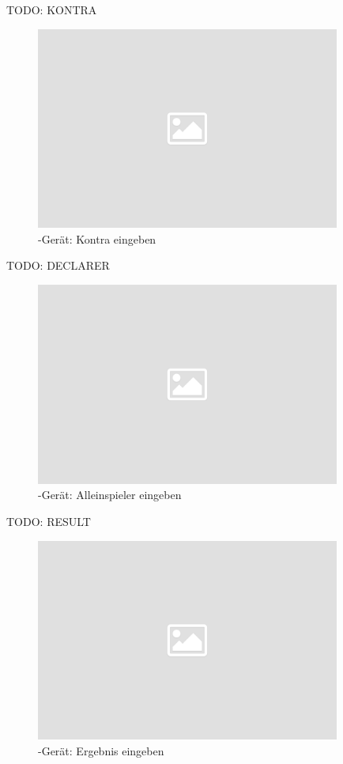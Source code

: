 \noindent
TODO: KONTRA\\[.1cm]

\noindent
\begin{figure}[ht]
	\centering
  \includegraphics[width=10cm]{pictures/placeholder.png}
	\caption{\cli-Gerät: Kontra eingeben}
	\label{pic/cli_2_contra}
\end{figure}

\noindent
TODO: DECLARER\\[.1cm]

\noindent
\begin{figure}[ht]
	\centering
  \includegraphics[width=10cm]{pictures/placeholder.png}
	\caption{\cli-Gerät: Alleinspieler eingeben}
	\label{pic/cli_2_declarer}
\end{figure}

\noindent
TODO: RESULT\\[.1cm]

\noindent
\begin{figure}[ht]
	\centering
  \includegraphics[width=10cm]{pictures/placeholder.png}
	\caption{\cli-Gerät: Ergebnis eingeben}
	\label{pic/cli_2_result}
\end{figure}

